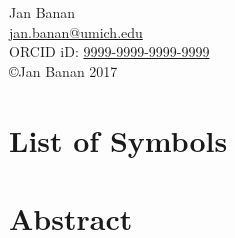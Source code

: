 \begin{center}
\begin{onehalfspacing}
  Jan Banan \\
  \href{mailto:jan.banan@umich.edu}{jan.banan@umich.edu} \\
  ORCID iD: \href{http://orcid.org/9999-9999-9999-9999}{9999-9999-9999-9999}\\
  \vspace{0.3in}
  \copyright\;Jan Banan 2017
\end{onehalfspacing}
\end{center}

\vfill
\hspace{0pt}


\cleardoublepage

\setcounter{page}{2}

\listoftodos

\tableofcontents

\cleardoublepage
{}
{}
\listoffigures

\cleardoublepage
{}
\listoftables
{}

\cleardoublepage
\listofappendices

\cleardoublepage
\printglossary[type=\acronymtype, title={List of Acronyms}]

\chapter{List of Symbols}


\chapter{Abstract}
\onehalfspacing



% 
